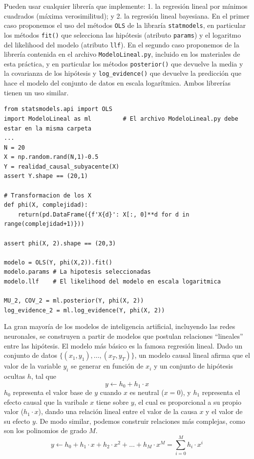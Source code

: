 \documentclass[a4paper,10pt]{article}
\begin{document}
\begin{framed}
Pueden usar cualquier librería que implemente: 1. la regresión lineal por mínimos cuadrados (máxima verosimilitud); y 2. la regresión lineal bayesiana.
%
En el primer caso proponemos el uso del métodos \texttt{OLS} de la libraría \texttt{statmodels}, en particular los métodos \texttt{fit()} que selecciona las hipótesis (atributo \texttt{params}) y el logaritmo del likelihood del modelo (atributo \texttt{llf}).
%
En el segundo caso proponemos de la librería contenida en el archivo \texttt{ModeloLineal.py}, incluido en los materiales de esta práctica, y en particular los métodos \texttt{posterior()} que devuelve la media y la covarianza de los hipótesis y \texttt{log\_evidence()} que devuelve la predicción que hace el modelo del conjunto de datos en escala logarítmica.
%
Ambos librerías tienen un uso similar.
\begin{lstlisting}[basicstyle=\small, backgroundcolor=\color{black!10}]
from statsmodels.api import OLS
import ModeloLineal as ml         # El archivo ModeloLineal.py debe estar en la misma carpeta
...
N = 20
X = np.random.rand(N,1)-0.5
Y = realidad_causal_subyacente(X)
assert Y.shape == (20,1)

# Transformacion de los X
def phi(X, complejidad):
    return(pd.DataFrame({f'X{d}': X[:, 0]**d for d in range(complejidad+1)}))

assert phi(X, 2).shape == (20,3)

modelo = OLS(Y, phi(X,2)).fit()
modelo.params # La hipotesis seleccionadas
modelo.llf    # El likelihood del modelo en escala logaritmica

MU_2, COV_2 = ml.posterior(Y, phi(X, 2))
log_evidence_2 = ml.log_evidence(Y, phi(X, 2))
\end{lstlisting}

\end{framed}

La gran mayoría de los modelos de inteligencia artificial, incluyendo las redes neuronales, se construyen a partir de modelos que postulan relaciones ``lineales'' entre las hipótesis.
El modelo más básico es la famosa regresión lineal.
Dado un conjunto de datos $\{(x_1, y_1), \dots, (x_T, y_T)\}$, un modelo causal lineal afirma que el valor de la variable $y_i$ se generar en función de $x_i$ y un conjunto de hipótesis ocultas $h$, tal que
$$y \leftarrow h_0 + h_1 \cdot x$$
$h_0$ representa el valor base de $y$ cuando $x$ es neutral ($x = 0$), y $h_1$ representa el efecto causal que la varibale $x$ tiene sobre $y$, el cual es proporcional a su propio valor ($h_1\cdot x$), dando una relación lineal entre el valor de la causa $x$ y el valor de su efecto $y$. De modo similar, podemos construir relaciones más complejas, como son los polinomios de grado $M$.
$$y \leftarrow h_0 + h_1 \cdot x + h_2 \cdot x^2 + \dots + h_M \cdot x^M = \sum_{i = 0}^M h_i \cdot x^i$$
\end{document}
